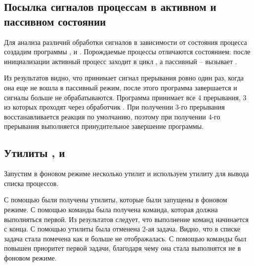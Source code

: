 \subsection{Посылка сигналов процессам в активном и пассивном состоянии}

Для анализа различий обработки сигналов в зависимости от состояния процесса создадим программы ,  и . Порождаемые процессы отличаются состоянием: после инициализации активный процесс заходит в цикл , а пассивный -- вызывает . 









Из результатов видно, что  принимает сигнал прерывания ровно один раз, когда она еще не вошла в пассивный режим, после этого программа завершается и сигналы  больше не обрабатываются. Программа  принимает все 4 прерывания, 3 из которых проходят через обработчик . При получении 3-го прерывания восстанавливается реакция по умолчанию, поэтому при получении 4-го прерывания выполняется принудительное завершение программы.

\subsection{Утилиты ,  и }

Запустим в фоновом режиме несколько утилит и используем утилиту  для вывода списка процессов.



С помощью  были получены утилиты, которые были запущены в фоновом режиме. С помощью команды  была получена команда, которая должна выполняться первой. Из результатов следует, что выполнение команд начинается с конца. С помощью утилиты  была отменена 2-ая задача. Видно, что в списке  задача стала помечена как  и больше не отображалась. С помощью команды  был повышен приоритет первой задачи, благодаря чему она стала выполнятся не в фоновом режиме.

